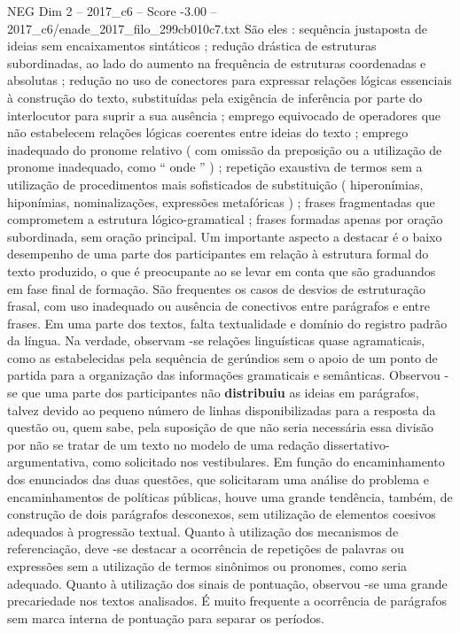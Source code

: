 \begin{textsample}{NEG Dim 2 – 2017\_c6 – Score -3.00 – 2017\_c6/enade\_2017\_filo\_299cb010c7.txt}
São eles : sequência justaposta de ideias sem encaixamentos sintáticos ; redução drástica de estruturas subordinadas, ao lado do aumento na frequência de estruturas coordenadas e absolutas ; redução no uso de conectores para expressar relações lógicas essenciais à construção do texto, substituídas pela exigência de inferência por parte do interlocutor para suprir a sua ausência ; emprego equivocado de operadores que não estabelecem relações lógicas coerentes entre ideias do texto ; emprego inadequado do pronome relativo ( com omissão da preposição ou a utilização de pronome inadequado, como “ onde ” ) ; repetição exaustiva de termos sem a utilização de procedimentos mais sofisticados de substituição ( hiperonímias, hiponímias, nominalizações, expressões metafóricas ) ; frases fragmentadas que comprometem a estrutura lógico-gramatical ; frases formadas apenas por oração subordinada, sem oração principal.
Um importante aspecto a destacar é o baixo desempenho de uma parte dos participantes em relação à estrutura formal do texto produzido, o que é preocupante ao se levar em conta que são graduandos em fase final de formação.
São frequentes os casos de desvios de estruturação frasal, com uso inadequado ou ausência de conectivos entre parágrafos e entre frases.
Em uma parte dos textos, falta textualidade e domínio do registro padrão da língua.
Na verdade, observam -se relações linguísticas quase agramaticais, como as estabelecidas pela sequência de gerúndios sem o apoio de um ponto de partida para a organização das informações gramaticais e semânticas.
Observou -se que uma parte dos participantes não \textbf{distribuiu} as ideias em parágrafos, talvez devido ao pequeno número de linhas disponibilizadas para a resposta da questão ou, quem sabe, pela suposição de que não seria necessária essa divisão por não se tratar de um texto no modelo de uma redação dissertativo-argumentativa, como solicitado nos vestibulares.
Em função do encaminhamento dos enunciados das duas questões, que solicitaram uma análise do problema e encaminhamentos de políticas públicas, houve uma grande tendência, também, de construção de dois parágrafos desconexos, sem utilização de elementos coesivos adequados à progressão textual.
Quanto à utilização dos mecanismos de referenciação, deve -se destacar a ocorrência de repetições de palavras ou expressões sem a utilização de termos sinônimos ou pronomes, como seria adequado.
Quanto à utilização dos sinais de pontuação, observou -se uma grande precariedade nos textos analisados.
É muito frequente a ocorrência de parágrafos sem marca interna de pontuação para separar os períodos.

\end{textsample}

